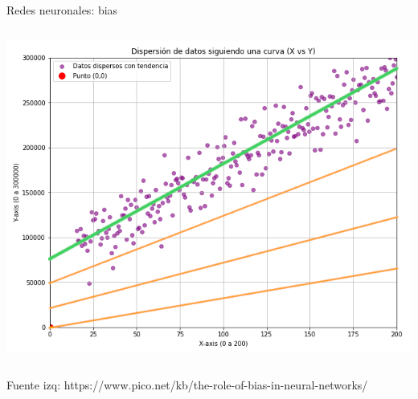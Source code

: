 \begin{frame}{Redes neuronales: bias}
\begin{columns}[c]
\begin{column}{0.4\textwidth}
    \includegraphics[width=\textwidth]{figures/Introduccion/bias-si-data.png}
\end{column}
\end{columns}

\scriptsize{
Fuente izq: https://www.pico.net/kb/the-role-of-bias-in-neural-networks/
}

\end{frame}


